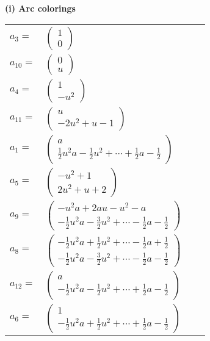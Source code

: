 \documentclass[1p]{elsarticle_modified}
\theoremstyle{definition}
\begin{document}
\flushleft \textbf{(i) Arc colorings}\\
\begin{tabular}{m{7pt} m{180pt} m{7pt} m{180pt} }
\flushright $a_{3}=$&$\begin{pmatrix}1\\0\end{pmatrix}$ \\
\flushright $a_{10}=$&$\begin{pmatrix}0\\u\end{pmatrix}$ \\
\flushright $a_{4}=$&$\begin{pmatrix}1\\- u^2\end{pmatrix}$ \\
\flushright $a_{11}=$&$\begin{pmatrix}u\\-2 u^2+u-1\end{pmatrix}$ \\
\flushright $a_{1}=$&$\begin{pmatrix}a\\\frac{1}{2} u^2 a-\frac{1}{2} u^2+\cdots+\frac{1}{2} a-\frac{1}{2}\end{pmatrix}$ \\
\flushright $a_{5}=$&$\begin{pmatrix}- u^2+1\\2 u^2+u+2\end{pmatrix}$ \\
\flushright $a_{9}=$&$\begin{pmatrix}- u^2 a+2 a u- u^2- a\\-\frac{1}{2} u^2 a-\frac{3}{2} u^2+\cdots-\frac{1}{2} a-\frac{1}{2}\end{pmatrix}$ \\
\flushright $a_{8}=$&$\begin{pmatrix}-\frac{1}{2} u^2 a+\frac{1}{2} u^2+\cdots-\frac{1}{2} a+\frac{1}{2}\\-\frac{1}{2} u^2 a-\frac{3}{2} u^2+\cdots-\frac{1}{2} a-\frac{1}{2}\end{pmatrix}$ \\
\flushright $a_{12}=$&$\begin{pmatrix}a\\-\frac{1}{2} u^2 a-\frac{1}{2} u^2+\cdots+\frac{1}{2} a-\frac{1}{2}\end{pmatrix}$ \\
\flushright $a_{6}=$&$\begin{pmatrix}1\\-\frac{1}{2} u^2 a+\frac{1}{2} u^2+\cdots+\frac{1}{2} a-\frac{1}{2}\end{pmatrix}$ \\

\end{tabular}
\end{document}
